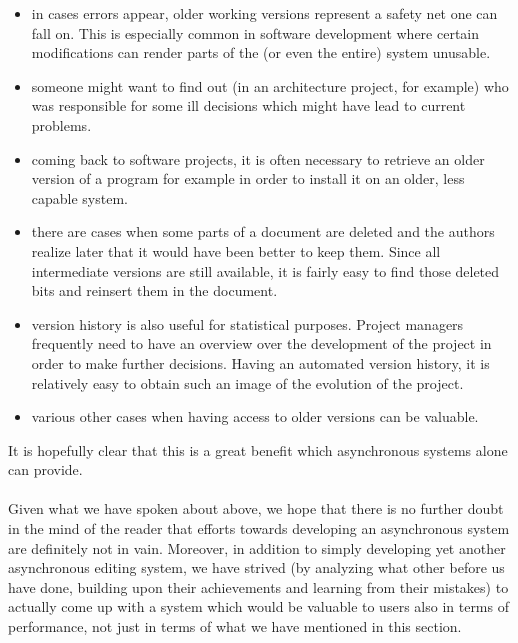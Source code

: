 \begin{itemize}
\item in cases errors appear, older working versions represent a safety net one can fall on. This
      is especially common in software development where certain modifications can render parts of
      the (or even the entire) system unusable.
\item someone might want to find out (in an architecture project, for example) who was responsible
      for some ill decisions which might have lead to current problems.
\item coming back to software projects, it is often necessary to retrieve an older version of a
      program for example in order to install it on an older, less capable system.
\item there are cases when some parts of a document are deleted and the authors realize later that
      it would have been better to keep them. Since all intermediate versions are still available,
      it is fairly easy to find those deleted bits and reinsert them in the document.
\item version history is also useful for statistical purposes. Project managers frequently need to
      have an overview over the development of the project in order to make further decisions. Having
      an automated version history, it is relatively easy to obtain such an image of the evolution
      of the project.
\item various other cases when having access to older versions can be valuable.
\end{itemize}

It is hopefully clear that this is a great benefit which asynchronous systems alone can provide.\\
\\
Given what we have spoken about above, we hope that there is no further doubt in the mind of
the reader that efforts towards developing an asynchronous system are definitely not in vain.
Moreover, in addition to simply developing yet another asynchronous editing system, we have
strived (by analyzing what other before us have done, building upon their achievements and
learning from their mistakes) to actually come up with a system which would be valuable to
users also in terms of performance, not just in terms of what we have mentioned in this section.